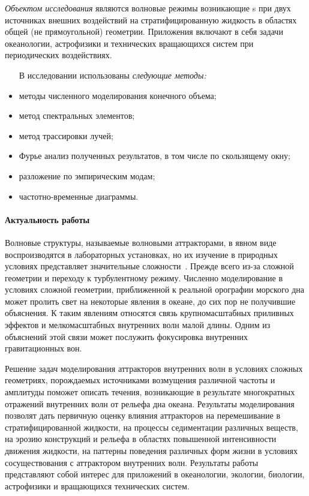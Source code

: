 \emph{Объектом исследования} являются волновые режимы возникающие s
при двух источниках внешних воздействий на стратифицированную жидкость в областях общей (не прямоугольной) геометрии. Приложения включают в себя задачи океанологии, астрофизики и технических вращающихся систем при периодических воздействиях. 

\begin{itemize}
  \item [    В исследовании использованы \emph{
следующие методы:}]
  \item методы численного моделирования конечного объема;
  \item метод спектральных элементов;
  \item метод трассировки лучей;
  \item Фурье анализ полученных результатов, в том числе по скользящему окну;
  \item разложение по эмпирическим модам;
  \item частотно-временные диаграммы.
\end{itemize}

\paragraph{Актуальность работы}

Волновые структуры, называемые волновыми аттракторами, в явном виде воспроизводятся в лабораторных установках, но их изучение в природных условиях представляет значительные сложности~\cite{ECHEVERRI2011}. Прежде всего из-за сложной геометрии и переходу к турбулентному режиму. Численно моделирование в условиях сложной геометрии, приближенной к реальной орографии морского дна может пролить свет на некоторые явления в океане, до сих пор не получившие объяснения. К таким явлениям относятся связь крупномасштабных приливных эффектов и мелкомасштабных внутренних волн малой длины. Одним из объяснений этой связи может послужить фокусировка внутренних гравитационных вон.  

Решение задач моделирования аттракторов внутренних волн в условиях сложных геометриях, порождаемых источниками возмущения различной частоты и амплитуды поможет описать течения, возникающие в результате многократных отражений внутренних волн от рельефа дна океана. Результаты моделирования позволят дать первичную оценку влияния аттракторов на перемешивание в стратифицированной жидкости, на процессы седиментации различных веществ, на эрозию конструкций и рельефа в областях повышенной интенсивности движения жидкости, на паттерны поведения различных форм жизни в условиях сосуществования с аттрактором внутренних волн. Результаты работы представляют собой интерес для приложений в океанологии, экологии, биологии, астрофизики и вращающихся технических систем. 

